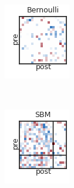 \begin{figure}[t!]
\begin{subfigure}[b]{1.10in}
    \centering
    \includegraphics[width=\textwidth]{figures/ch3/Bernoulli-Gaussian.png}
  \end{subfigure}
  ~
  \hspace{-.1in}
  \begin{subfigure}[b]{1.10in}
    \centering
    \includegraphics[width=\textwidth]{figures/ch3/SBM-Gaussian.png}

\end{subfigure}
\end{figure}
